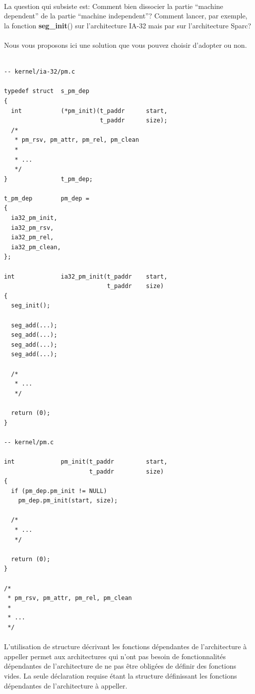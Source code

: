 \documentclass[10pt,a4wide]{article}
\begin{document}
\paragraph{}

La question qui subsiste est: Comment bien dissocier la partie ``machine
dependent'' de la partie ``machine independent''? Comment lancer, par
exemple, la fonction \textbf{seg\_init}() sur l'architecture IA-32 mais par sur
l'architecture Sparc?

\paragraph{}

Nous vous proposons ici une solution que vous pouvez choisir d'adopter ou non.

\begin{verbatim}

-- kernel/ia-32/pm.c

typedef struct  s_pm_dep
{
  int           (*pm_init)(t_paddr      start,
                           t_paddr      size);
  /*
   * pm_rsv, pm_attr, pm_rel, pm_clean
   *
   * ...
   */
}               t_pm_dep;

t_pm_dep        pm_dep =
{
  ia32_pm_init,
  ia32_pm_rsv,
  ia32_pm_rel,
  ia32_pm_clean,
};

int             ia32_pm_init(t_paddr    start,
                             t_paddr    size)
{
  seg_init();

  seg_add(...);
  seg_add(...);
  seg_add(...);
  seg_add(...);

  /*
   * ...
   */

  return (0);
}

-- kernel/pm.c

int             pm_init(t_paddr         start,
                        t_paddr         size)
{
  if (pm_dep.pm_init != NULL)
    pm_dep.pm_init(start, size);

  /*
   * ...
   */

  return (0);
}

/*
 * pm_rsv, pm_attr, pm_rel, pm_clean
 *
 * ...
 */
\end{verbatim}

\paragraph{}

L'utilisation de structure d\'ecrivant les fonctions d\'ependantes de
l'architecture \`a appeller permet aux architectures qui n'ont pas
besoin de fonctionnalit\'es d\'ependantes de l'architecture de ne
pas \^etre oblig\'ees de d\'efinir des fonctions vides. La seule d\'eclaration
requise \'etant la structure d\'efinissant les fonctions d\'ependantes
de l'architecture \`a appeller.
\end{document}
